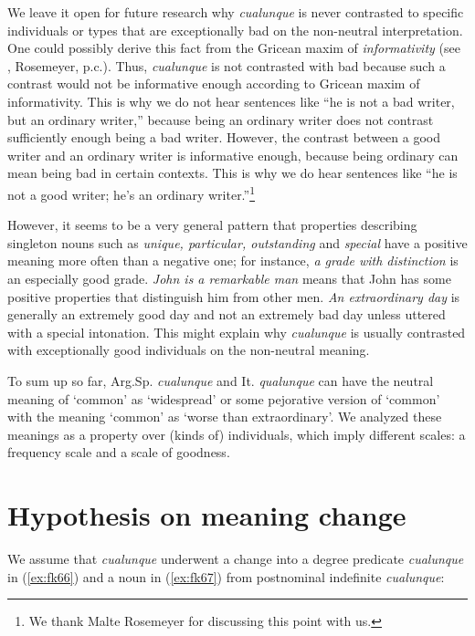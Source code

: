 \documentclass[output=paper,colorlinks,citecolor=brown]{langscibook}
\begin{document}
We leave it open for future research why \textit{cualunque} is never contrasted to specific individuals or types that are exceptionally bad on the non-neutral interpretation. One could possibly derive this fact from the Gricean maxim of \textit{informativity} (see \cite{Geurts2010}, Rosemeyer, p.c.). Thus, \textit{cualunque} is not contrasted with bad because such a contrast would not be informative enough according to Gricean maxim of informativity. This is why we do not hear sentences like “he is not a bad writer, but an ordinary writer,” because being an ordinary writer does not contrast sufficiently enough being a bad writer. However, the contrast between a good writer and an ordinary writer is informative enough, because being ordinary can mean being bad in certain contexts. This is why we do hear sentences like “he is not a good writer; he’s an ordinary writer.”\footnote{We thank Malte Rosemeyer for discussing this point with us.}

However, it seems to be a very general pattern that properties describing singleton nouns such as \textit{unique, particular, outstanding} and \textit{special} have a positive meaning more often than a negative one; for instance, \textit{a grade with distinction} is an especially good grade. \textit{John is a remarkable man} means that John has some positive properties that distinguish him from other men. \textit{An extraordinary day} is generally an extremely good day and not an extremely bad day unless uttered with a special intonation. This might explain why \textit{cualunque} is usually contrasted with exceptionally good individuals on the non-neutral meaning.

To sum up so far, Arg.Sp. \textit{cualunque} and It. \textit{qualunque} can have the neutral meaning of ‘common’ as ‘widespread’ or some pejorative version of ‘common’ with the meaning ‘common’ as ‘worse than extraordinary’. We analyzed these meanings as a property over (kinds of) individuals, which imply different scales: a frequency scale and a scale of goodness.

\section{Hypothesis on meaning change}\label{sec:fk6}

We assume that \textit{cualunque} underwent a change into a degree predicate \textit{cualunque} in (\ref{ex:fk66}) and a noun in (\ref{ex:fk67}) from postnominal indefinite \textit{cualunque}:
\end{document}
